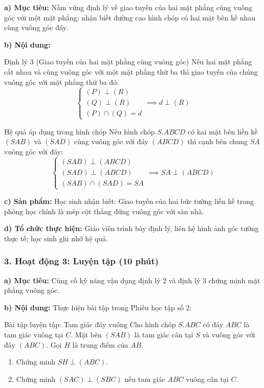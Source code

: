 \documentclass[12pt, a4paper]{article}
\begin{document}
\noindent \textbf{a) Mục tiêu:}
Nắm vững định lý về giao tuyến của hai mặt phẳng cùng vuông góc với một mặt phẳng; nhận biết đường cao hình chóp có hai mặt bên kề nhau cùng vuông góc đáy.

\noindent \textbf{b) Nội dung:}
\begin{pedabox}{Định lý 3 (Giao tuyến của hai mặt phẳng cùng vuông góc)}
Nếu hai mặt phẳng cắt nhau và cùng vuông góc với một mặt phẳng thứ ba thì giao tuyến của chúng vuông góc với mặt phẳng thứ ba đó:
$$\begin{cases} (P) \perp (R) \\ (Q) \perp (R) \\ (P) \cap (Q) = d \end{cases} \implies d \perp (R)$$
\end{pedabox}

\begin{pedabox}{Hệ quả áp dụng trong hình chóp}
Nếu hình chóp $S.ABCD$ có hai mặt bên liền kề $(SAB)$ và $(SAD)$ cùng vuông góc với đáy $(ABCD)$ thì cạnh bên chung $SA$ vuông góc với đáy:
$$\begin{cases} (SAB) \perp (ABCD) \\ (SAD) \perp (ABCD) \\ (SAB) \cap (SAD) = SA \end{cases} \implies SA \perp (ABCD)$$
\end{pedabox}

\noindent \textbf{c) Sản phẩm:}
Học sinh nhận biết: Giao tuyến của hai bức tường liền kề trong phòng học chính là mép cột thẳng đứng vuông góc với sàn nhà.

\noindent \textbf{d) Tổ chức thực hiện:}
Giáo viên trình bày định lý, liên hệ hình ảnh góc tường thực tế; học sinh ghi nhớ hệ quả.

\subsubsection*{3. Hoạt động 3: Luyện tập (10 phút)}

\noindent \textbf{a) Mục tiêu:}
Củng cố kỹ năng vận dụng định lý 2 và định lý 3 chứng minh mặt phẳng vuông góc.

\noindent \textbf{b) Nội dung:}
Thực hiện bài tập trong Phiếu học tập số 2:
\begin{pedabox}{Bài tập luyện tập: Tam giác đáy vuông}
Cho hình chóp $S.ABC$ có đáy $ABC$ là tam giác vuông tại $C$. Mặt bên $(SAB)$ là tam giác cân tại $S$ và vuông góc với đáy $(ABC)$. Gọi $H$ là trung điểm của $AB$.
\begin{enumerate}[leftmargin=0.6cm]
    \item Chứng minh $SH \perp (ABC)$.
    \item Chứng minh $(SAC) \perp (SBC)$ nếu tam giác $ABC$ vuông cân tại $C$.
\end{enumerate}
\end{pedabox}
\end{document}
